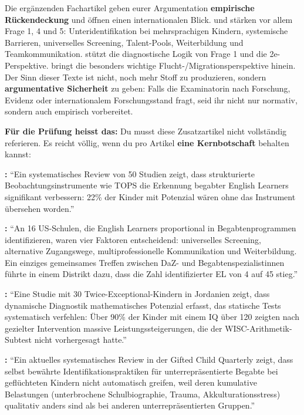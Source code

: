 \documentclass[ngerman, a4paper]{article}
\begin{document}
\begin{kapitelueberblick}
  Die ergänzenden Fachartikel geben eurer Argumentation \textbf{empirische Rückendeckung} und öffnen einen internationalen Blick. \textcite{mun2020identifying} und \textcite{gubbins2020promising} stärken vor allem Frage 1, 4 und 5: Unteridentifikation bei mehrsprachigen Kindern, systemische Barrieren, universelles Screening, Talent-Pools, Weiterbildung und Teamkommunikation. \textcite{alhroub2021utility} stützt die diagnostische Logik von Frage 1 und die 2e-Perspektive. \textcite{alodat2025equitable} bringt die besonders wichtige Flucht-/Migrationsperspektive hinein. Der Sinn dieser Texte ist nicht, noch mehr Stoff zu produzieren, sondern \textbf{argumentative Sicherheit} zu geben: Falls die Examinatorin nach Forschung, Evidenz oder internationalem Forschungsstand fragt, seid ihr nicht nur normativ, sondern auch empirisch vorbereitet.

  \medskip\textbf{Für die Prüfung heisst das:} Du musst diese Zusatzartikel nicht vollständig referieren. Es reicht völlig, wenn du pro Artikel \textbf{eine Kernbotschaft} behalten kannst:

  \medskip\textbf{\textcite{mun2020identifying}:} \enquote{Ein systematisches Review von 50 Studien zeigt, dass
    strukturierte Beobachtungsinstrumente wie TOPS die Erkennung begabter English Learners
    signifikant verbessern: 22\% der Kinder mit Potenzial wären ohne das Instrument übersehen
    worden.}

  \medskip\textbf{\textcite{gubbins2020promising}:} \enquote{An 16 US-Schulen, die English Learners proportional
    in Begabtenprogrammen identifizieren, waren vier Faktoren entscheidend: universelles
    Screening, alternative Zugangswege, multiprofessionelle Kommunikation und Weiterbildung.
    Ein einziges gemeinsames Treffen zwischen DaZ- und Begabtenspezialistinnen führte in
    einem Distrikt dazu, dass die Zahl identifizierter EL von 4 auf 45 stieg.}

  \medskip\textbf{\textcite{alhroub2021utility}:} \enquote{Eine Studie mit 30 Twice-Exceptional-Kindern in Jordanien
    zeigt, dass dynamische Diagnostik mathematisches Potenzial erfasst, das statische Tests
    systematisch verfehlen: Über 90\% der Kinder mit einem IQ über 120 zeigten nach gezielter
    Intervention massive Leistungssteigerungen, die der WISC-Arithmetik-Subtest nicht
    vorhergesagt hatte.}

  \medskip\textbf{\textcite{alodat2025equitable}:} \enquote{Ein aktuelles systematisches Review in der \textup{Gifted Child
      Quarterly} zeigt, dass selbst bewährte Identifikationspraktiken für unterrepräsentierte
    Begabte bei geflüchteten Kindern nicht automatisch greifen, weil deren kumulative
    Belastungen (unterbrochene Schulbiographie, Trauma, Akkulturationsstress) qualitativ anders
    sind als bei anderen unterrepräsentierten Gruppen.}
\end{kapitelueberblick}
\end{document}
